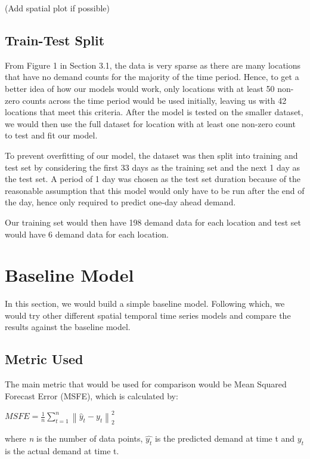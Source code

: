 \documentclass[12pt, letterpaper] {article}
\begin{document}
(Add spatial plot if possible)


\subsection{Train-Test Split}
From Figure 1 in Section 3.1, the data is very sparse as there are many locations that have no demand counts for the majority of the time period. Hence, to get a better idea of how our models would work, only locations with at least 50 non-zero counts across the time period would be used initially, leaving us with 42 locations that meet this criteria. After the model is tested on the smaller dataset, we would then use the full dataset for location with at least one non-zero count to test and fit our model. 

\noindent To prevent overfitting of our model, the dataset was then split into training and test set by considering the first 33 days as the training set and the next 1 day as the test set. A period of 1 day was chosen as the test set duration because of the reasonable assumption that this model would only have to be run after the end of the day, hence only required to predict one-day ahead demand. 

\noindent Our training set would then have 198 demand data for each location and test set would have 6 demand data for each location. 

\section{Baseline Model}
In this section, we would build a simple baseline model. Following which, we would try other different spatial temporal time series models and compare the results against the baseline model. 

\subsection{Metric Used}
The main metric that would be used for comparison would be Mean Squared Forecast Error (MSFE), which is calculated by:

\begin{center}
    $\displaystyle MSFE=\frac{1}{n}\sum_{t=1}^{n}\left \| \hat{y}_{t} - y_{t} \right \|_{2}^{2}$
\end{center}
where \textit{n} is the number of data points, $\hat{y_t}$ is the predicted demand at time t and ${y_t}$ is the actual demand at time t.
\end{document}
